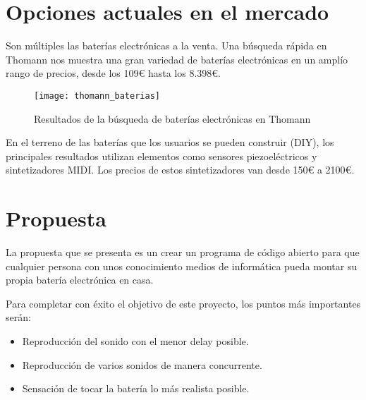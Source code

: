 

    \section{Opciones actuales en el mercado} %
    \label{sec:OpcionesActualesEnElMercado}

        Son múltiples las baterías electrónicas a la venta. Una búsqueda rápida en Thomann \cite{thomann_baterias} nos
        muestra una gran variedad de baterías electrónicas en un amplío rango de precios, desde los 109\euro{} hasta los
        8.398\euro{}.

        \begin{figure}[ht]
            \centering
            \texttt{[image: thomann\_baterias]}
            \caption{Resultados de la búsqueda de baterías electrónicas en Thomann \cite{thomann_baterias}
                     \label{fig:ThomannBusqueda}}
        \end{figure}

        En el terreno de las baterías que los usuarios se pueden construir (DIY), los principales resultados
        \cite{drum_magazine_diy_kit} utilizan elementos como sensores piezoeléctricos y sintetizadores MIDI. Los precios
        de estos sintetizadores van desde 150\euro{} a 2100\euro{}.


    \section{Propuesta} %
    \label{sec:Propuesta}

        La propuesta que se presenta es un crear un programa de código abierto para que cualquier persona con unos
        conocimiento medios de informática pueda montar su propia batería electrónica en casa.

        Para completar con éxito el objetivo de este proyecto, los puntos más importantes serán:

        \begin{itemize}
            \item Reproducción del sonido con el menor delay posible.
            \item Reproducción de varios sonidos de manera concurrente.
            \item Sensación de tocar la batería lo más realista posible.
        \end{itemize}


